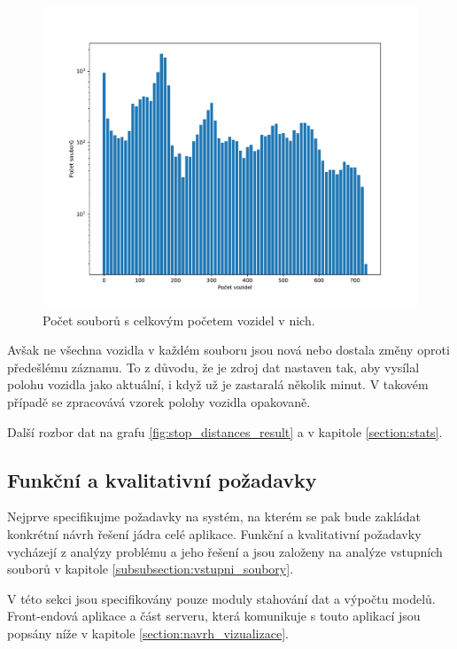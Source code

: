 \begin{figure}
	\centering
  \includegraphics[width=\linewidth]{../img/all_trips}
  \caption{Počet souborů s celkovým početem vozidel v nich.}
  \label{fig:vehicle_pos_x_all_trips}
\end{figure}

\bigbreak

Avšak ne všechna vozidla v každém souboru jsou nová nebo dostala změny oproti předešlému záznamu. To z důvodu, že je zdroj dat nastaven tak, aby vysílal polohu vozidla jako aktuální, i když už je zastaralá několik minut. V takovém případě se zpracovává vzorek polohy vozidla opakovaně.

\bigbreak

Další rozbor dat na grafu \ref{fig:stop_distances_result} a v kapitole \ref{section:stats}.

\subsection{Funkční a kvalitativní požadavky}


Nejprve specifikujme požadavky na systém, na kterém se pak bude zakládat
konkrétní návrh řešení jádra celé aplikace. Funkční a kvalitativní požadavky vycházejí z analýzy problému a jeho řešení a jsou založeny na analýze vstupních souborů v kapitole \ref{subsubsection:vstupni_soubory}.

\bigbreak

V této sekci jsou specifikovány pouze moduly stahování dat a výpočtu modelů. Front-endová aplikace a část serveru, která komunikuje s touto aplikací jsou popsány níže v kapitole \ref{section:navrh_vizualizace}.


